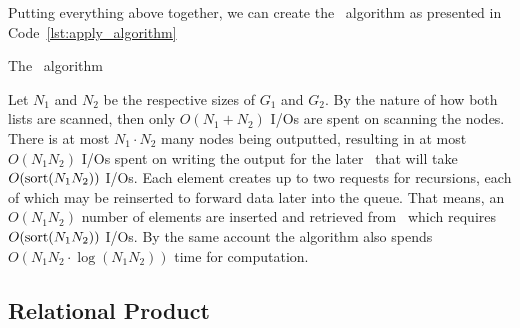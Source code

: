 \begin{lstfloat}[ht!]
  \centering

  

  \caption{Construction of to-be-outputted node \lstinline{v'} and recursing
    using \ApplyQrec.}
  \label{lst:apply_recurse_node}
\end{lstfloat}

Putting everything above together, we can create the \Apply\ algorithm as
presented in Code~\ref{lst:apply_algorithm}

\begin{lstfloat}[ht!]
  \centering

  

  \caption{The \Apply\ algorithm}
  \label{lst:apply_algorithm}
\end{lstfloat}

\clearpage
Let $N_1$ and $N_2$ be the respective sizes of $G_1$ and $G_2$. By the nature of
how both lists are scanned, then only $O(N_1 + N_2)$ I/Os are spent on scanning
the nodes. There is at most $N_1 \cdot N_2$ many nodes being outputted,
resulting in at most $O(N_1 N_2)$ I/Os spent on writing the output for the later
\Reduce\ that will take $O(\text{sort}(N_1 N_2))$ I/Os. Each element creates up to two
requests for recursions, each of which may be reinserted to forward data later
into the queue. That means, an $O(N_1 N_2)$ number of elements are inserted and
retrieved from \ApplyQrec\ which requires $O(\text{sort}(N_1 N_2))$ I/Os. By the same
account the algorithm also spends $O(N_1 N_2 \cdot \log (N_1 N_2))$ time for
computation. \cite{Arge96}

\subsection{Relational Product} \label{sec:theory__relational_product}



